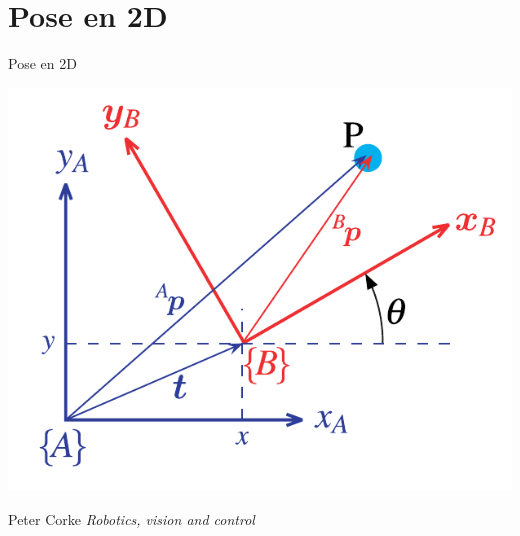 \documentclass[presentation,aspectratio=169]{beamer}
\begin{document}
\section{Pose en 2D}
\label{sec:org6eee849}

\begin{frame}[label={sec:orgb0644c4}]{Pose en 2D}
\begin{center}
\includegraphics[height=0.5\textheight]{../figures/Corke-fig2.6.png}

\footnotesize Peter Corke \emph{Robotics, vision and control}
\end{center}
\end{frame}
\end{document}
